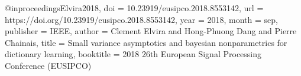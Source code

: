 @inproceedings{Elvira2018,
  doi = {10.23919/eusipco.2018.8553142},
  url = {https://doi.org/10.23919/eusipco.2018.8553142},
  year  = {2018},
  month = {sep},
  publisher = {{IEEE}},
  author = {Clement Elvira and Hong-Phuong Dang and Pierre Chainais},
  title = {Small variance asymptotics and bayesian nonparametrics for dictionary learning},
  booktitle = {2018 26th European Signal Processing Conference ({EUSIPCO})}
}
